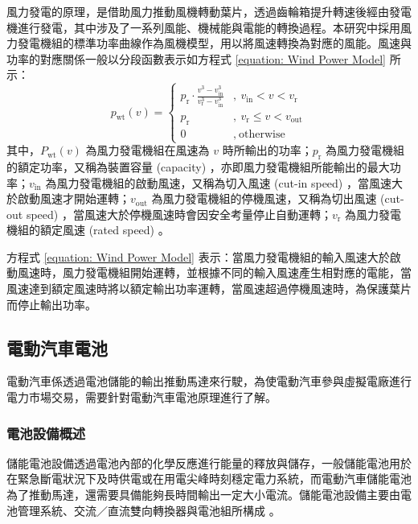 風力發電的原理，是借助風力推動風機轉動葉片，透過齒輪箱提升轉速後經由發電機進行發電，其中涉及了一系列風能、機械能與電能的轉換過程。本研究中採用風力發電機組的標準功率曲線作為風機模型，用以將風速轉換為對應的風能。風速與功率的對應關係一般以分段函數表示如方程式 \eqref{equation: Wind Power Model} 所示：
%
\begin{equation}\label{equation: Wind Power Model}
  p_{\text{wt}}(v) = \left\{
  \begin{array}{cl}
    \displaystyle p_{\text{r}} \cdot \frac{v^{3} - v_{\text{in}}^{3}}{v_{\text{r}}^{3} - v_{\text{in}}^{3}} & ,~ {v}_{\text{in}} < v < v_{\text{r}} \\[0.5em]
    p_{\text{r}} & ,~ v_{\text{r}} \leq v < v_{\text{out}} \\[0.5em]
    0 & ,~ \text{otherwise}
  \end{array}\right.
\end{equation}
%
其中，$P_{\text{wt}}(v)$ 為風力發電機組在風速為 $v$ 時所輸出的功率；$p_{\text{r}}$ 為風力發電機組的額定功率，又稱為裝置容量 (capacity) ，亦即風力發電機組所能輸出的最大功率；$v_{\text{in}}$ 為風力發電機組的啟動風速，又稱為切入風速 (cut-in speed) ，當風速大於啟動風速才開始運轉；$v_{\text{out}}$ 為風力發電機組的停機風速，又稱為切出風速 (cut-out speed) ，當風速大於停機風速時會因安全考量停止自動運轉；$v_{\text{r}}$ 為風力發電機組的額定風速 (rated speed) 。

方程式 \eqref{equation: Wind Power Model} 表示：當風力發電機組的輸入風速大於啟動風速時，風力發電機組開始運轉，並根據不同的輸入風速產生相對應的電能，當風速達到額定風速時將以額定輸出功率運轉，當風速超過停機風速時，為保護葉片而停止輸出功率。

\subsection{電動汽車電池}

電動汽車係透過電池儲能的輸出推動馬達來行駛，為使電動汽車參與虛擬電廠進行電力市場交易，需要針對電動汽車電池原理進行了解。

\subsubsection{電池設備概述}

儲能電池設備透過電池內部的化學反應進行能量的釋放與儲存，一般儲能電池用於在緊急斷電狀況下及時供電或在用電尖峰時刻穩定電力系統，而電動汽車儲能電池為了推動馬達，還需要具備能夠長時間輸出一定大小電流。儲能電池設備主要由電池管理系統、交流／直流雙向轉換器與電池組所構成 \cite{qian2010high}。


